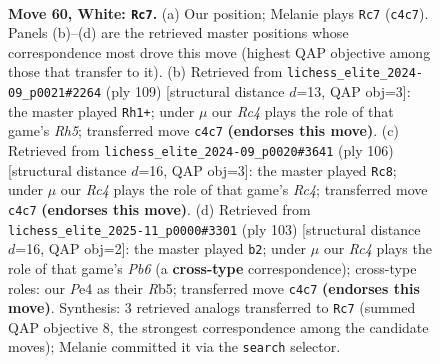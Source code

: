 \documentclass[11pt]{article}
\begin{document}
\clearpage

\begin{figure}[p]\centering
\begin{subfigure}{0.46\textwidth}\centering
\resizebox{\linewidth}{!}{%
\newchessgame
\chessboard[
  setfen={1R6/5p2/4p1k1/8/P1R1PK2/5P2/7r/8 w - - 11 60},
  showmover=false,
  pgfstyle=straightmove, color=movearrow, markmove={c4-c7}
]}
\caption{}
\end{subfigure}\hfill
\begin{subfigure}{0.46\textwidth}\centering
\resizebox{\linewidth}{!}{%
\newchessgame
\chessboard[
  setfen={R7/8/5p2/5kp1/4p2r/4P3/5P2/5K2 b - - 11 55},
  showmover=false,
  pgfstyle=straightmove, color=movearrow, markmove={h4-h1}
]}
\caption{}
\end{subfigure}
\\[4pt]
\begin{subfigure}{0.46\textwidth}\centering
\resizebox{\linewidth}{!}{%
\newchessgame
\chessboard[
  setfen={8/8/1r3kp1/7p/2R4P/5PK1/6P1/8 w - - 4 54},
  showmover=false,
  pgfstyle=straightmove, color=movearrow, markmove={c4-c8}
]}
\caption{}
\end{subfigure}\hfill
\begin{subfigure}{0.46\textwidth}\centering
\resizebox{\linewidth}{!}{%
\newchessgame
\chessboard[
  setfen={4R3/6p1/8/1rp2PK1/2k4P/1p6/8/8 b - - 1 52},
  showmover=false,
  pgfstyle=straightmove, color=movearrow, markmove={b3-b2}
]}
\caption{}
\end{subfigure}
\caption{\textbf{Move 60, White: \texttt{Rc7}.} (a) Our position; Melanie plays \texttt{Rc7} (\texttt{c4c7}). Panels (b)--(d) are the retrieved master positions whose correspondence most drove this move (highest QAP objective among those that transfer to it). (b) Retrieved from \texttt{lichess\_elite\_2024-09\_p0021\#2264} (ply 109) [structural distance $d$=13, QAP obj=3]: the master played \texttt{Rh1+}; under $\mu$ our \emph{Rc4} plays the role of that game's \emph{Rh5}; transferred move \texttt{c4c7} \textbf{(endorses this move)}. (c) Retrieved from \texttt{lichess\_elite\_2024-09\_p0020\#3641} (ply 106) [structural distance $d$=16, QAP obj=3]: the master played \texttt{Rc8}; under $\mu$ our \emph{Rc4} plays the role of that game's \emph{Rc4}; transferred move \texttt{c4c7} \textbf{(endorses this move)}. (d) Retrieved from \texttt{lichess\_elite\_2025-11\_p0000\#3301} (ply 103) [structural distance $d$=16, QAP obj=2]: the master played \texttt{b2}; under $\mu$ our \emph{Rc4} plays the role of that game's \emph{Pb6} (a \textbf{cross-type} correspondence); cross-type roles: our \emph{P}e4 as their \emph{R}b5; transferred move \texttt{c4c7} \textbf{(endorses this move)}. Synthesis: 3 retrieved analogs transferred to \texttt{Rc7} (summed QAP objective 8, the strongest correspondence among the candidate moves); Melanie committed it via the \texttt{search} selector.}
\label{fig:thought-m118}
\end{figure}
\end{document}
